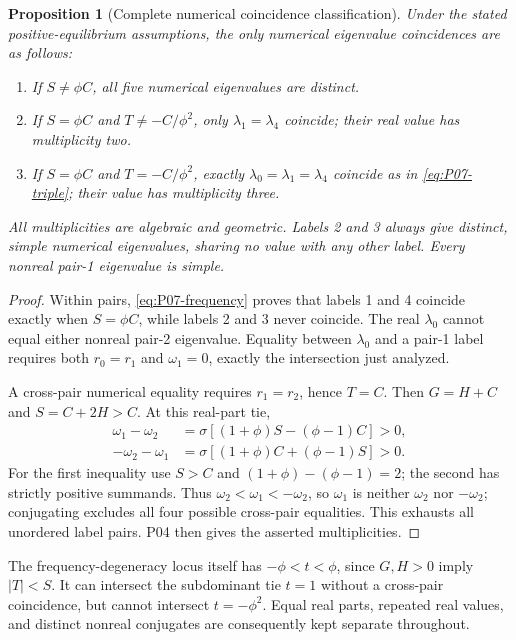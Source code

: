 \documentclass[11pt]{article}
\newtheorem{proposition}[theorem]{Proposition}
\theoremstyle{definition}
\theoremstyle{remark}
\begin{document}
\begin{proposition}[Complete numerical coincidence classification]
\label{prop:P07-coincidences}
Under the stated positive-equilibrium assumptions, the only numerical
 eigenvalue coincidences are as follows:
\begin{enumerate}[label=(\roman*),leftmargin=*]
\item If $S\ne\phi C$, all five numerical eigenvalues are distinct.
\item If $S=\phi C$ and $T\ne-C/\phi^2$, only
$\lambda_1=\lambda_4$ coincide; their real value has multiplicity two.
\item If $S=\phi C$ and $T=-C/\phi^2$, exactly
$\lambda_0=\lambda_1=\lambda_4$ coincide as in
\eqref{eq:P07-triple}; their value has multiplicity three.
\end{enumerate}
All multiplicities are algebraic and geometric. Labels 2 and 3 always
give distinct, simple numerical eigenvalues, sharing no value with any
other label. Every nonreal pair-1 eigenvalue is simple.
\end{proposition}
\begin{proof}
Within pairs, \eqref{eq:P07-frequency} proves that labels 1 and 4
coincide exactly when $S=\phi C$, while labels 2 and 3 never coincide.
The real $\lambda_0$ cannot equal either nonreal pair-2 eigenvalue.
Equality between $\lambda_0$ and a pair-1 label requires both
$r_0=r_1$ and $\omega_1=0$, exactly the intersection just analyzed.

A cross-pair numerical equality requires $r_1=r_2$, hence $T=C$.
Then $G=H+C$ and $S=C+2H>C$. At this real-part tie,
\begin{align*}
 \omega_1-\omega_2
    &=\sigma[(1+\phi)S-(\phi-1)C]>0,\\
 -\omega_2-\omega_1
    &=\sigma[(1+\phi)C+(\phi-1)S]>0.
\end{align*}
For the first inequality use $S>C$ and
$(1+\phi)-(\phi-1)=2$; the second has strictly positive summands.
Thus $\omega_2<\omega_1<-\omega_2$, so
$\omega_1$ is neither $\omega_2$ nor $-\omega_2$; conjugating
excludes all four possible cross-pair equalities. This exhausts all
unordered label pairs. P04 then gives the asserted multiplicities.
\end{proof}
The frequency-degeneracy locus itself has $-\phi<t<\phi$, since
$G,H>0$ imply $|T|<S$. It can intersect the subdominant tie $t=1$
without a cross-pair coincidence, but cannot intersect $t=-\phi^2$.
Equal real parts, repeated real values, and distinct nonreal conjugates
are consequently kept separate throughout.
\end{document}
